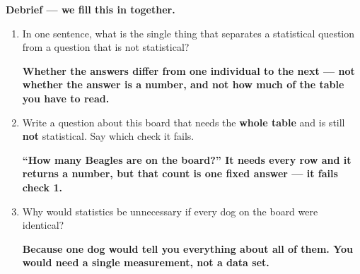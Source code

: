 \documentclass[10pt]{article}
\newcommand{\answerspace}[2]{\par\nopagebreak\noindent\begin{minipage}[t][#1][t]{\linewidth}%
  \color{keyred}\bfseries #2\end{minipage}\par}
\begin{document}
\vspace{0.10in}

\boxguard[18]
\begin{reflectionbox}
\small
\textbf{Debrief --- we fill this in together.}
\begin{enumerate}[leftmargin=1.9em, itemsep=8pt]
  \item In one sentence, what is the single thing that separates a statistical question from
        a question that is not statistical?
        \answerspace{1.2cm}{Whether the answers \textbf{differ from one individual to the next}
        --- not whether the answer is a number, and not how much of the table you have to read.}
  \item Write a question about this board that needs the \textbf{whole table} and is still
        \textbf{not} statistical. Say which check it fails.
        \answerspace{1.4cm}{``How many Beagles are on the board?'' It needs every row and it
        returns a number, but that count is one fixed answer --- it fails check 1.}
  \item Why would statistics be unnecessary if every dog on the board were identical?
        \answerspace{1.2cm}{Because one dog would tell you everything about all of them. You
        would need a single measurement, not a data set.}
\end{enumerate}
\end{reflectionbox}
\end{document}
